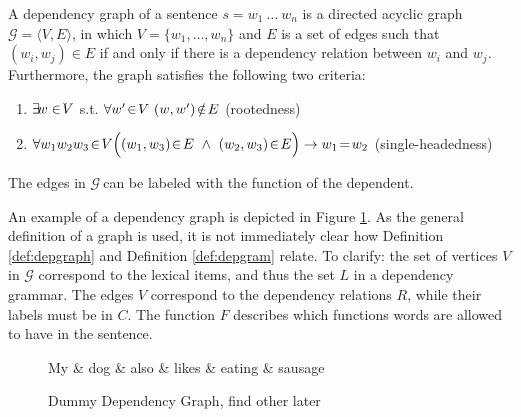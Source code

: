 \begin{definition}\label{def:depgraph}
A dependency graph of a sentence $s = w_1~\ldots~w_n$ is a directed acyclic graph $\mathcal{G} = \langle V, E\rangle$, in which $V = \{w_1, \ldots,w_n\}$ and $E$ is a set of edges such that $(w_i,w_j)\in E$ if and only if there is a dependency relation between $w_i$ and $w_j$. Furthermore, the graph satisfies the following two criteria:
\begin{enumerate}
\item $\exists\negthinspace w\in\negthinspace V$ s.t. $\forall w'\negthinspace\in\negthinspace V~(w,w')\negthinspace\notin\negthinspace E$ \hfill (rootedness)
\item $\forall w_1 w_2 w_3\negthinspace \in\negthinspace V\Big( (w_1,w_3)\negthinspace\in\negthinspace E~\land~(w_2,w_3)\negthinspace \in\negthinspace E\Big) \rightarrow w_1\negthinspace=\negthinspace w_2$ \hfill (single-headedness)
\end{enumerate}
The edges in $\mathcal{G}~$can be labeled with the function of the dependent.
\end{definition}

\noindent An example of a dependency graph is depicted in Figure \ref{fig:depgraph}. As the general definition of a graph is used, it is not immediately clear how  Definition \ref{def:depgraph} and Definition \ref{def:depgram} relate. To clarify: the set of vertices $V$ in $\mathcal{G}$ correspond to the lexical items, and thus the set $L$ in a dependency grammar. The edges $V$ correspond to the dependency relations $R$, while their labels must be in $C$. The function $F$ describes which functions words are allowed to have in the sentence. 

\begin{figure}[!ht]
\centering
\begin{dependency}[theme=simple]%
\begin{deptext}[column sep=.5cm, row sep=.1ex]
My \& dog \& also \& likes \& eating \& sausage \\
\end{deptext}
\end{dependency}
\caption{Dummy Dependency Graph, find other later}\label{fig:depgraph}
\end{figure}

